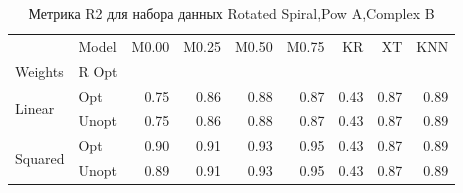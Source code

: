 \begin{table}
\caption{Метрика R2 для набора данных Rotated Spiral,Pow A,Complex B}
\label{tab:R2_Rotated Spiral,Pow A,Complex B}
\begin{tabular}{llrrrrrrr}
\toprule
 & Model & M0.00 & M0.25 & M0.50 & M0.75 & KR & XT & KNN \\
Weights & R Opt &  &  &  &  &  &  &  \\
\midrule
\multirow[t]{2}{*}{Linear} & Opt & 0.75 & 0.86 & 0.88 & 0.87 & 0.43 & 0.87 & 0.89 \\
 & Unopt & 0.75 & 0.86 & 0.88 & 0.87 & 0.43 & 0.87 & 0.89 \\

\multirow[t]{2}{*}{Squared} & Opt & 0.90 & 0.91 & 0.93 & 0.95 & 0.43 & 0.87 & 0.89 \\
 & Unopt & 0.89 & 0.91 & 0.93 & 0.95 & 0.43 & 0.87 & 0.89 \\

\bottomrule
\end{tabular}
\end{table}
